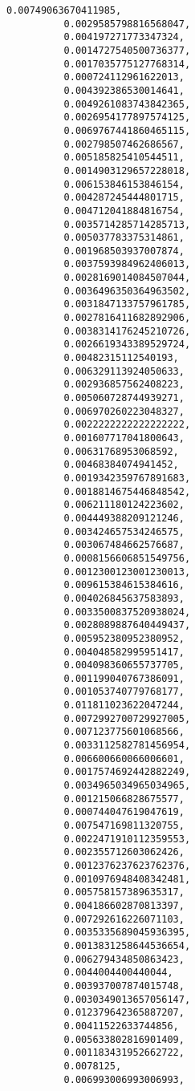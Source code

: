 \documentclass[11pt]{article}
\begin{document}
\begin{Verbatim}[commandchars=\\\{\}]
          0.00749063670411985,
          0.0029585798816568047,
          0.004197271773347324,
          0.0014727540500736377,
          0.0017035775127768314,
          0.000724112961622013,
          0.004392386530014641,
          0.0049261083743842365,
          0.0026954177897574125,
          0.0069767441860465115,
          0.002798507462686567,
          0.005185825410544511,
          0.0014903129657228018,
          0.006153846153846154,
          0.004287245444801715,
          0.004712041884816754,
          0.0035714285714285713,
          0.005037783375314861,
          0.001968503937007874,
          0.0037593984962406013,
          0.0028169014084507044,
          0.0036496350364963502,
          0.0031847133757961785,
          0.0027816411682892906,
          0.0038314176245210726,
          0.0026619343389529724,
          0.00482315112540193,
          0.006329113924050633,
          0.002936857562408223,
          0.005060728744939271,
          0.006970260223048327,
          0.0022222222222222222,
          0.001607717041800643,
          0.00631768953068592,
          0.00468384074941452,
          0.0019342359767891683,
          0.0018814675446848542,
          0.006211180124223602,
          0.004449388209121246,
          0.003424657534246575,
          0.003067484662576687,
          0.0008156606851549756,
          0.0012300123001230013,
          0.009615384615384616,
          0.004026845637583893,
          0.0033500837520938024,
          0.0028089887640449437,
          0.005952380952380952,
          0.004048582995951417,
          0.004098360655737705,
          0.001199040767386091,
          0.001053740779768177,
          0.011811023622047244,
          0.0072992700729927005,
          0.007123775601068566,
          0.0033112582781456954,
          0.006600660066006601,
          0.0017574692442882249,
          0.0034965034965034965,
          0.001215066828675577,
          0.000744047619047619,
          0.007547169811320755,
          0.0022471910112359553,
          0.002355712603062426,
          0.0012376237623762376,
          0.0010976948408342481,
          0.005758157389635317,
          0.004186602870813397,
          0.007292616226071103,
          0.0035335689045936395,
          0.0013831258644536654,
          0.006279434850863423,
          0.0044004400440044,
          0.003937007874015748,
          0.0030349013657056147,
          0.012379642365887207,
          0.00411522633744856,
          0.005633802816901409,
          0.001183431952662722,
          0.0078125,
          0.006993006993006993,

\end{Verbatim}
\end{document}
